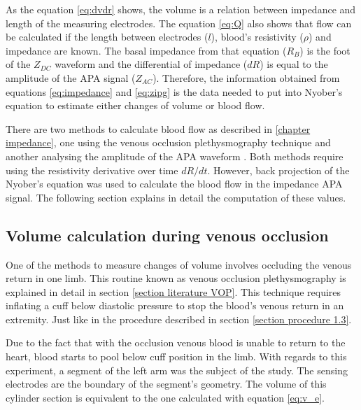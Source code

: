 As the equation \ref{eq:dvdr} shows, the volume is a relation between impedance and length of the measuring electrodes. The equation \ref{eq:Q} also shows that flow can be calculated if the length between electrodes ($l$), blood's resistivity ($\rho$) and impedance are known.  The basal impedance from that equation ($R_B$) is the foot of the $Z_{DC}$ waveform and the differential of impedance ($dR$) is equal to the amplitude of the APA signal ($Z_{AC}$). Therefore, the information obtained from equations \ref{eq:impedance} and \ref{eq:zipg} is the data needed to put into Nyober's equation to estimate either changes of volume or blood flow.

There are two methods to calculate blood flow as described in \ref{chapter impedance}, one using the venous occlusion plethysmography technique \cite{anderson1984impedance,costeloe1980continuous,mohapatra1981non,golden1986assessment} and another analysing the amplitude of the APA waveform \cite{nyboer1974blood,costeloe1980continuous}. Both methods require using the resistivity derivative over time $dR/dt$. However, back projection of the Nyober's equation was used to calculate the blood flow in the impedance APA signal. The following section explains in detail the computation of these values.  

\subsection{Volume calculation during venous occlusion}
\label{section procedure volume vop}
One of the methods to measure changes of volume involves occluding the venous return in one limb. This routine known as venous occlusion plethysmography is explained in detail in section \ref{section literature VOP}. This technique requires inflating a cuff below diastolic pressure to stop the blood's venous return in an extremity. Just like in the procedure described in section \ref{section procedure 1.3}. 

Due to the fact that with the occlusion venous blood is unable to return to the heart, blood starts to pool below cuff position in the limb. With regards to this experiment, a segment of the left arm was the subject of the study. The sensing electrodes are the boundary of the segment's geometry. The volume of this cylinder section is equivalent to the one calculated with equation \ref{eq:v_e}. 

